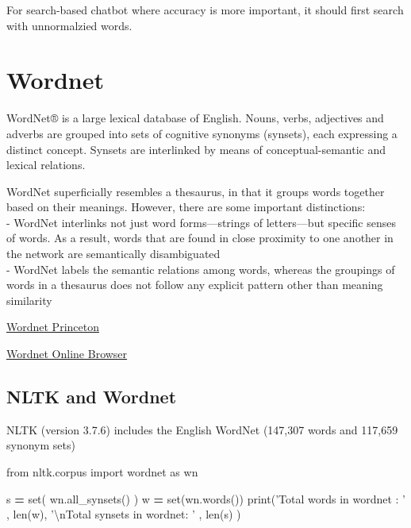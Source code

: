 \documentclass[
]{book}
\newenvironment{Shaded}{\begin{snugshade}}{\end{snugshade}}
\newcommand{\BuiltInTok}[1]{#1}
\newcommand{\CharTok}[1]{\textcolor[rgb]{0.5,0.5,0.5}{#1}}
\newcommand{\ImportTok}[1]{#1}
\newcommand{\NormalTok}[1]{#1}
\newcommand{\OperatorTok}[1]{\textcolor[rgb]{0.43,0.43,0.43}{\textbf{#1}}}
\newcommand{\StringTok}[1]{\textcolor[rgb]{0.5,0.5,0.5}{#1}}
\begin{document}
For search-based chatbot where accuracy is more important, it should first search with unnormalzied words.

\hypertarget{wordnet}{%
\section{Wordnet}\label{wordnet}}

WordNet® is a large lexical database of English. Nouns, verbs, adjectives and adverbs are grouped into sets of cognitive synonyms (synsets), each expressing a distinct concept. Synsets are interlinked by means of conceptual-semantic and lexical relations.

WordNet superficially resembles a thesaurus, in that it groups words together based on their meanings. However, there are some important distinctions:\\
- WordNet interlinks not just word forms---strings of letters---but specific senses of words. As a result, words that are found in close proximity to one another in the network are semantically disambiguated\\
- WordNet labels the semantic relations among words, whereas the groupings of words in a thesaurus does not follow any explicit pattern other than meaning similarity

\href{https://wordnet.princeton.edu}{Wordnet Princeton}

\href{http://wordnetweb.princeton.edu/perl/webwn}{Wordnet Online Browser}

\hypertarget{nltk-and-wordnet}{%
\subsection{NLTK and Wordnet}\label{nltk-and-wordnet}}

NLTK (version 3.7.6) includes the English WordNet (147,307 words and 117,659 synonym sets)

\begin{Shaded}
\begin{Highlighting}[]
\ImportTok{from}\NormalTok{ nltk.corpus }\ImportTok{import}\NormalTok{ wordnet }\ImportTok{as}\NormalTok{ wn}

\NormalTok{s }\OperatorTok{=} \BuiltInTok{set}\NormalTok{( wn.all_synsets() )}
\NormalTok{w }\OperatorTok{=} \BuiltInTok{set}\NormalTok{(wn.words())}
\BuiltInTok{print}\NormalTok{(}\StringTok{'Total words in wordnet  : '}\NormalTok{ ,   }\BuiltInTok{len}\NormalTok{(w),}
      \StringTok{'}\CharTok{\textbackslash{}n}\StringTok{Total synsets in wordnet: '}\NormalTok{ , }\BuiltInTok{len}\NormalTok{(s) )}
\end{Highlighting}
\end{Shaded}
\end{document}
